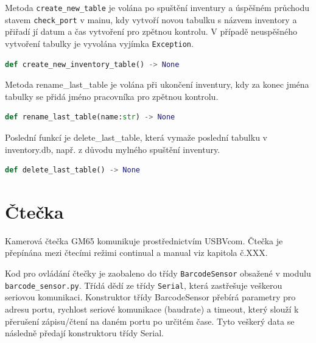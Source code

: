 Metoda \texttt{create\_new\_table} je volána po spuštění inventury a úspěšném průchodu stavem \texttt{check\_port} v mainu, kdy vytvoří novou tabulku s názvem inventory a přiřadí jí datum a čas vytvoření pro zpětnou kontrolu. V případě neuspěšného vytvoření tabulky je vyvolána vyjímka \texttt{Exception}.
\begin{lstlisting}[language=Python,breaklines=false, frame=single]
def create_new_inventory_table() -> None
\end{lstlisting}
\bigskip
Metoda rename\_last\_table je volána při ukončení inventury, kdy za konec jména tabulky se přidá jméno pracovníka pro zpětnou kontrolu.
\begin{lstlisting}[language=Python,breaklines=false, frame=single]
def rename_last_table(name:str) -> None
\end{lstlisting}
\bigskip
Poslední funkcí je delete\_last\_table, která vymaže poslední tabulku v inventory.db, např. z důvodu mylného spuštění inventury.
\begin{lstlisting}[language=Python,breaklines=false, frame=single]
def delete_last_table() -> None
\end{lstlisting}

%




\section{Čtečka}
Kamerová čtečka GM65 komunikuje prostřednictvím USBVcom. Čtečka je přepínána mezi čtecími režimi continual a manual viz kapitola č.XXX. 

Kod pro ovládání čtečky je zaobaleno do třídy \texttt{BarcodeSensor} obsažené v modulu \texttt{barcode\_sensor.py}. Třídá dědí ze třídy \texttt{Serial}, která zastřešuje veškerou seriovou komunikaci. Konstruktor třídy BarcodeSensor přebírá parametry pro adresu portu, rychlost seriové komunikace (baudrate) a timeout, který slouží k přerušení zápisu/čtení na daném portu po určitém čase. Tyto veškerý data se následně předají konstruktoru třídy Serial. 

